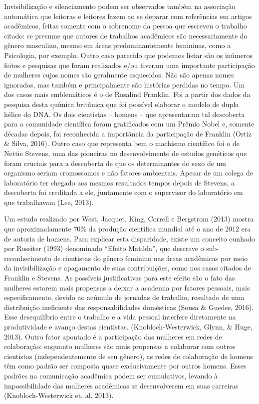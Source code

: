 Invisibilização e silenciamento podem ser observados também na associação automática que leitoras e leitores fazem ao se deparar com referências em artigos acadêmicos, feitas somente com o sobrenome da pessoa que escreveu o trabalho citado: se presume que autores de trabalhos acadêmicos são necessariamente do gênero masculino, mesmo em áreas predominantemente femininas, como a Psicologia, por exemplo. Outro caso parecido que podemos listar são os inúmeros feitos e pesquisas que foram realizados e/ou tiveram uma importante participação de mulheres cujos nomes são geralmente esquecidos. Não são apenas nomes ignorados, mas também e principalmente são histórias perdidas no tempo. Um dos casos mais emblemáticos é o de Rosalind Franklin. Foi a partir dos dados da pesquisa desta química britânica que foi possível elaborar o modelo de dupla hélice do DNA. Os dois cientistas – homens – que apresentaram tal descoberta para a comunidade científica foram gratificados com um Prêmio Nobel e, somente décadas depois, foi reconhecida a importância da participação de Franklin (Ortiz \& Silva, 2016). Outro caso que representa bem o machismo científico foi o de Nettie Stevens, uma das pioneiras no desenvolvimento de estudos genéticos que foram cruciais para a descoberta de que os determinantes do sexo de um organismo seriam cromossomos e não fatores ambientais. Apesar de um colega de laboratório ter chegado aos mesmos resultados tempos depois de Stevens, a descoberta foi creditada a ele, juntamente com o supervisor do laboratório em que trabalhavam (Lee, 2013).

Um estudo realizado por West, Jacquet, King, Correll e Bergstrom (2013) mostra que aproximadamente 70\% da produção científica mundial até o ano de 2012 era de autoria de homens. Para explicar esta disparidade, existe um conceito cunhado por Rossiter (1993) denominado ``Efeito Matilda'', que descreve o sub-reconhecimento de cientistas do gênero feminino nas áreas acadêmicas por meio da invisibilização e apagamento de suas contribuições, como nos casos citados de Franklin e Stevens. As possíveis justificativas para este efeito são o fato das mulheres estarem mais propensas a deixar a academia por fatores pessoais, mais especificamente, devido ao acúmulo de jornadas de trabalho, resultado de uma distribuição ineficiente das responsabilidades domésticas (Sousa \& Guedes, 2016). Esse desequilíbrio entre o trabalho e a vida pessoal interfere diretamente na produtividade e avanço destas cientistas. (Knobloch-Westerwick, Glynn, \& Huge, 2013). Outro fator apontado é a participação das mulheres em redes de colaboração: enquanto mulheres são mais propensas a colaborar com outros cientistas (independentemente de seu gênero), as redes de colaboração de homens têm como padrão ser composta quase exclusivamente por outros homens. Esses padrões na comunicação acadêmica podem ser cumulativos, levando à impossibilidade das mulheres acadêmicas se desenvolverem em suas carreiras (Knobloch-Westerwick et. al. 2013).

